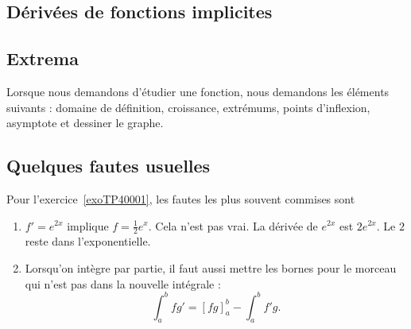 \subsection{Dérivées de fonctions implicites}

\subsection{Extrema}


Lorsque nous demandons d'étudier une fonction, nous demandons les éléments suivants : domaine de définition, croissance, extrémums, points d'inflexion, asymptote et dessiner le graphe.



\subsection{Quelques fautes usuelles}

Pour l'exercice~\ref{exoTP40001}, les fautes les plus souvent commises sont
\begin{enumerate}

	\item
	      $f'= e^{2x}$ implique $f=\frac{1}{ 2 } e^{x}$. Cela n'est pas vrai. La dérivée de $ e^{2x}$ est $2 e^{2x}$. Le $2$ reste dans l'exponentielle.

	\item
	      Lorsqu'on intègre par partie, il faut aussi mettre les bornes pour le morceau qui n'est pas dans la nouvelle intégrale :
	      \begin{equation}
		      \int_a^b fg'=[fg]_a^b-\int_a^bf'g.
	      \end{equation}
\end{enumerate}


